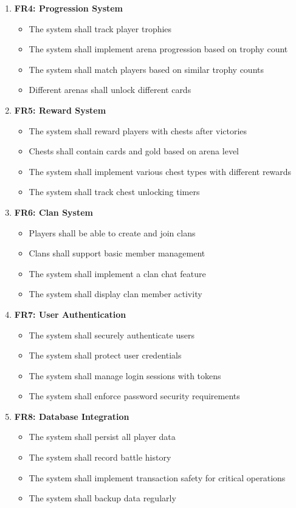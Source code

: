 \documentclass{article}
\begin{document}
\begin{enumerate}
    \item \textbf{FR4: Progression System}
    \begin{itemize}
        \item The system shall track player trophies
        \item The system shall implement arena progression based on trophy count
        \item The system shall match players based on similar trophy counts
        \item Different arenas shall unlock different cards
    \end{itemize}

    \item \textbf{FR5: Reward System}
    \begin{itemize}
        \item The system shall reward players with chests after victories
        \item Chests shall contain cards and gold based on arena level
        \item The system shall implement various chest types with different rewards
        \item The system shall track chest unlocking timers
    \end{itemize}

    \item \textbf{FR6: Clan System}
    \begin{itemize}
        \item Players shall be able to create and join clans
        \item Clans shall support basic member management
        \item The system shall implement a clan chat feature
        \item The system shall display clan member activity
    \end{itemize}

    \item \textbf{FR7: User Authentication}
    \begin{itemize}
        \item The system shall securely authenticate users
        \item The system shall protect user credentials
        \item The system shall manage login sessions with tokens
        \item The system shall enforce password security requirements
    \end{itemize}

    \item \textbf{FR8: Database Integration}
    \begin{itemize}
        \item The system shall persist all player data
        \item The system shall record battle history
        \item The system shall implement transaction safety for critical operations
        \item The system shall backup data regularly
    \end{itemize}
\end{enumerate}
\end{document}
